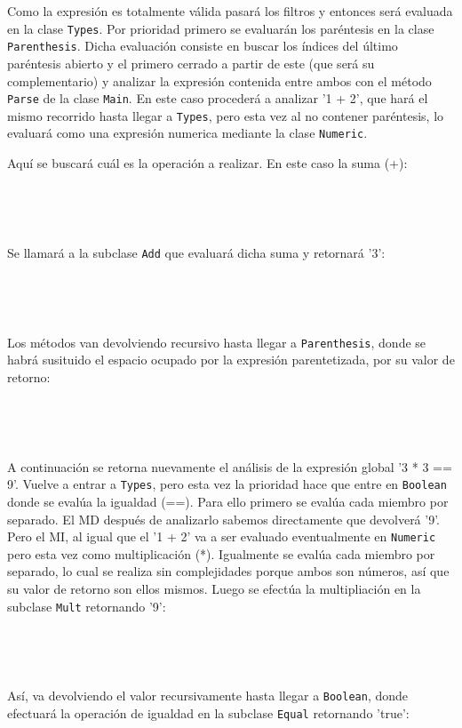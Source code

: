 \documentclass{article}
\begin{document}
Como la expresión es totalmente válida pasará los filtros y entonces será evaluada en la clase {\texttt{Types}}. Por
prioridad primero se evaluarán los paréntesis en la clase {\texttt{Parenthesis}}. Dicha evaluación consiste en buscar
los índices del último paréntesis abierto y el primero cerrado a partir de este (que será su complementario) y analizar
la expresión contenida entre ambos con el método {\texttt{Parse}} de la clase {\texttt{Main}}. En este caso procederá a
analizar '1 + 2', que hará el mismo recorrido hasta llegar a {\texttt{Types}}, pero esta vez al no contener paréntesis, 
lo evaluará como una expresión numerica mediante la clase {\texttt{Numeric}}. 


Aquí se buscará cuál es la operación a realizar. En este caso la suma (+): 


\ 





\ 


Se llamará a la subclase {\texttt{Add}} que evaluará dicha suma y retornará '3':


\ 




\ 


Los métodos van devolviendo recursivo hasta llegar a {\texttt{Parenthesis}}, donde se habrá susituido el espacio 
ocupado por la expresión parentetizada, por su valor de retorno:


\ 





\ 


A continuación se retorna nuevamente el análisis de la expresión global '3 * 3 == 9'. Vuelve a entrar a 
{\texttt{Types}}, pero esta vez la prioridad hace que entre en {\texttt{Boolean}} donde se evalúa la igualdad (==). Para ello 
primero se evalúa cada miembro por separado. El MD después de analizarlo sabemos directamente que devolverá '9'. Pero el MI, al 
igual que el '1 + 2' va a ser evaluado eventualmente en {\texttt{Numeric}} pero esta vez como multiplicación (*). Igualmente se 
evalúa cada miembro por separado, lo cual se realiza sin complejidades porque ambos son números, así que su valor de retorno son
ellos mismos. Luego se efectúa la multipliación en la subclase {\texttt{Mult}} retornando '9':


\ 





\ 


Así, va devolviendo el 
valor recursivamente hasta llegar a {\texttt{Boolean}}, donde efectuará la operación de igualdad en la subclase 
{\texttt{Equal}} retornando 'true':
\end{document}
